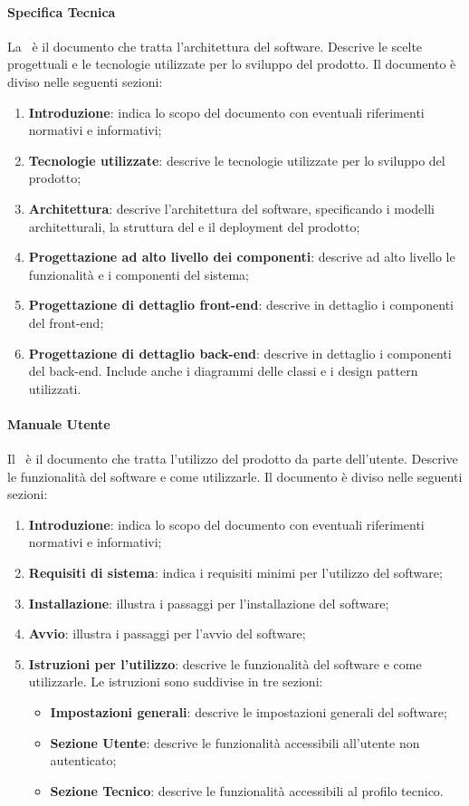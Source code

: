 \paragraph{Specifica Tecnica}
La \ST\ è il documento che tratta l'architettura del software. Descrive le scelte progettuali e le tecnologie utilizzate per lo sviluppo del prodotto.
Il documento è diviso nelle seguenti sezioni:
\begin{enumerate}
  \item \textbf{Introduzione}: indica lo scopo del documento con eventuali riferimenti normativi e informativi;
  \item \textbf{Tecnologie utilizzate}: descrive le tecnologie utilizzate per lo sviluppo del prodotto; 
  \item \textbf{Architettura}: descrive l'architettura del software, specificando i modelli architetturali, la struttura del  e il deployment del prodotto;
  \item \textbf{Progettazione ad alto livello dei componenti}: descrive ad alto livello le funzionalità e i componenti del sistema;
  \item \textbf{Progettazione di dettaglio front-end}: descrive in dettaglio i componenti del front-end;
  \item \textbf{Progettazione di dettaglio back-end}: descrive in dettaglio i componenti del back-end. Include anche i diagrammi delle classi e i design pattern utilizzati.
\end{enumerate}

\paragraph{Manuale Utente}
Il \MU\ è il documento che tratta l'utilizzo del prodotto da parte dell'utente. Descrive le funzionalità del software e come utilizzarle.
Il documento è diviso nelle seguenti sezioni:
\begin{enumerate}
  \item \textbf{Introduzione}: indica lo scopo del documento con eventuali riferimenti normativi e informativi;
  \item \textbf{Requisiti di sistema}: indica i requisiti minimi per l'utilizzo del software; 
  \item \textbf{Installazione}: illustra i passaggi per l'installazione del software;
  \item \textbf{Avvio}: illustra i passaggi per l'avvio del software;
  \item \textbf{Istruzioni per l'utilizzo}: descrive le funzionalità del software e come utilizzarle. Le istruzioni sono suddivise in tre sezioni:
  \begin{itemize}
    \item \textbf{Impostazioni generali}: descrive le impostazioni generali del software;
    \item \textbf{Sezione Utente}: descrive le funzionalità accessibili all'utente non autenticato;
    \item \textbf{Sezione Tecnico}: descrive le funzionalità accessibili al profilo tecnico.
  \end{itemize}
\end{enumerate}

